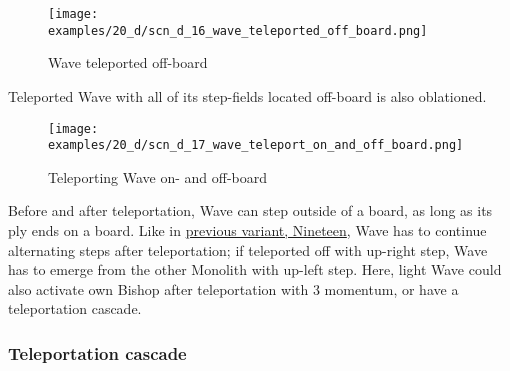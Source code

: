 \clearpage %

\vspace*{-2.3\baselineskip}
\noindent
\begin{figure}[!h]
\texttt{[image: examples/20\_d/scn\_d\_16\_wave\_teleported\_off\_board.png]}
\vspace*{-1.3\baselineskip}
\caption{Wave teleported off-board}
\label{fig:scn_d_16_wave_teleported_off_board}
\end{figure}

\vspace*{-0.4\baselineskip}
Teleported Wave with all of its step-fields located off-board is also oblationed.

\clearpage %

\vspace*{-2.3\baselineskip}
\noindent
\begin{figure}[!h]
\texttt{[image: examples/20\_d/scn\_d\_17\_wave\_teleport\_on\_and\_off\_board.png]}
\vspace*{-1.3\baselineskip}
\caption{Teleporting Wave on- and off-board}
\label{fig:scn_d_17_wave_teleport_on_and_off_board}
\end{figure}

\vspace*{-0.4\baselineskip}
Before and after teleportation, Wave can step outside of a board, as long as its ply ends
on a board. Like in \hyperref[fig:scn_n_08_teleport_wave_end]{previous variant, Nineteen},
Wave has to continue alternating steps after teleportation; if teleported off with up-right
step, Wave has to emerge from the other Monolith with up-left step. Here, light Wave could
also activate own Bishop after teleportation with 3 momentum, or have a teleportation cascade.

\clearpage %

\subsubsection*{Teleportation cascade}
\label{sec:Discovery/Monolith/Teleporting/Teleportation cascade}

